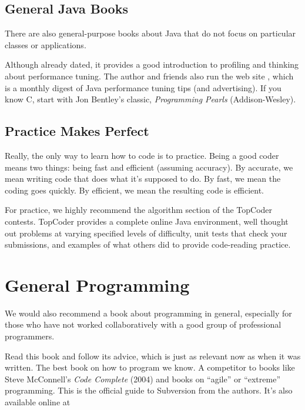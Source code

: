 \subsection{General Java Books}

There are also general-purpose books about Java that do
not focus on particular classes or applications.
%
\begin{itemize}
%
{Although already dated, it provides a good introduction to
  profiling and thinking about performance tuning.  The author and friends
  also run the web site , which is a
  monthly digest of Java performance tuning tips (and advertising).
  If you know C, start with Jon Bentley's classic, {\it Programming
  Pearls} (Addison-Wesley).}
%
\end{itemize}


\subsection{Practice Makes Perfect}

\noindent
Really, the only way to learn how to code is to practice.  Being a
good coder means two things: being fast and efficient (assuming
accuracy).  By accurate, we mean writing code that does what it's
supposed to do.  By fast, we mean the coding goes quickly.  By efficient,
we mean the resulting code is efficient.

For practice, we highly recommend the algorithm section of the
TopCoder contests.  TopCoder provides a complete online Java
environment, well thought out problems at varying specified levels of
difficulty, unit tests that check your submissions, and examples of
what others did to provide code-reading practice.
%
\begin{quote}
\end{quote}
%



\section{General Programming}

\noindent
We would also recommend a book about programming in general, 
especially for those who have not worked collaboratively with
a good group of professional programmers.
%
\begin{itemize}
{Read this book and follow its advice, which is just as relevant now
as when it was written.  The best book on how to program
we know.  A competitor to books like Steve McConnell's {\it Code Complete} (2004)
and books on ``agile'' or ``extreme'' programming.}
%
{This is the official guide to Subversion from the
authors.  It's also available online at
%
}
\end{itemize}


